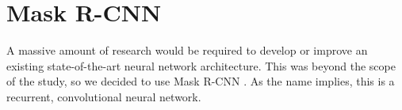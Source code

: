 \section{Mask R-CNN}
A massive amount of research would be required to develop or improve an existing state-of-the-art neural network architecture. This was beyond the scope of the study, so we decided to use Mask R-CNN \cite{He.20170405}. As the name implies, this is a recurrent, convolutional neural network.